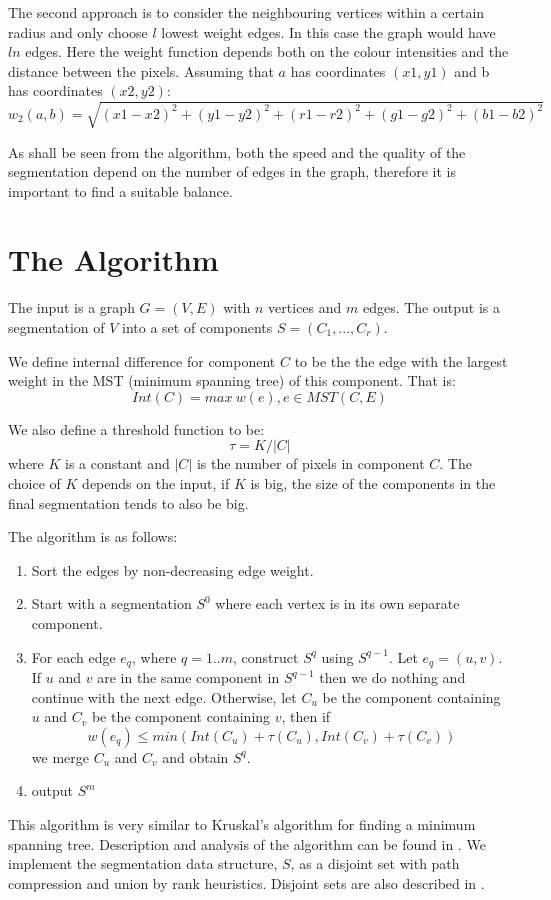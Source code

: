 The second approach is to consider the neighbouring vertices within a certain radius and only choose $l$ lowest weight edges.
In this case the graph would have $ln$ edges. Here the weight function depends both on the colour intensities and the distance
between the pixels. Assuming that $a$ has coordinates $(x1,y1)$ and b has coordinates $(x2,y2)$:
\[
w_2(a,b) = \sqrt{(x1-x2)^2 + (y1-y2)^2 + (r1-r2)^2 + (g1-g2)^2 + (b1-b2)^2}
\]

As shall be seen from the algorithm, both the speed and the quality of the segmentation depend on the number of edges in
the graph, therefore it is important to find a suitable balance.

\section{The Algorithm}
The input is a graph $G = (V, E)$ with $n$ vertices and $m$ edges. The output is a segmentation of $V$ into a set of components 
$S = (C_1,...,C_r)$.

We define internal difference for component $C$ to be the the edge with the largest weight in the MST (minimum spanning tree) of this 
component. That is:
\[
Int(C) = max\ w(e), e \in MST(C,E)
\]

We also define a threshold function to be:
\[
\tau = K / |C|
\]
where $K$ is a constant and $|C|$ is the number of pixels in component $C$. The choice of $K$ depends on the input,
if $K$ is big, the size of the components in the final segmentation tends to also be big.

The algorithm is as follows:
\begin{enumerate}
\item Sort the edges by non-decreasing edge weight.
\item Start with a segmentation $S^0$ where each vertex is in its own separate component.
\item For each edge $e_q$, where $q = 1..m$, construct $S^q$ using $S^{q-1}$. Let $e_q = (u, v)$. 
If $u$ and $v$ are in the same component in $S^{q-1}$ then we do nothing and continue with the next edge.
Otherwise, let $C_u$ be the component containing $u$ and $C_v$ be the component containing $v$, then if
\[
w(e_q) \leq min(Int(C_u) + \tau(C_u), Int(C_v) + \tau(C_v)) 
\]
we merge $C_u$ and $C_v$ and obtain $S^q$.
\item output $S^m$
\end{enumerate}

This algorithm is very similar to Kruskal's algorithm for finding a minimum spanning tree. Description and analysis of the algorithm
can be found in \cite{cormen01}. We implement the segmentation data structure, $S$, as a disjoint set with path compression and union by rank heuristics.
Disjoint sets are also described in \cite{cormen01}. 

